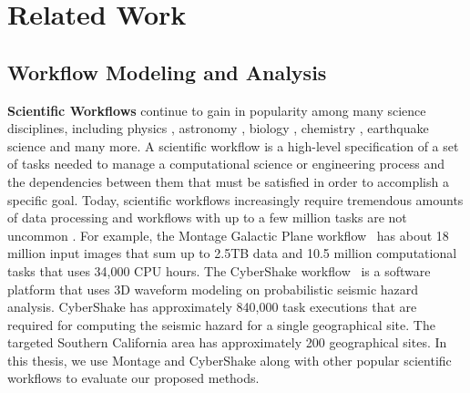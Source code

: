                              \chapter{Related Work}
\label{chap:related}






\section{Workflow Modeling and Analysis}

\textbf{Scientific Workflows} continue to gain in popularity among many science disciplines, including physics \cite{Deelman2002}, astronomy \cite{Sakellariou2010}, biology \cite{Lathers2006, Oinn2004}, chemistry \cite{Wieczorek2005}, earthquake science \cite{Maechling2007} and many more. A scientific workflow is a high-level specification of a set of tasks needed to manage a computational science or engineering process and the dependencies between them that must be satisfied in order to accomplish a specific goal. Today, scientific workflows increasingly require tremendous amounts of data processing and workflows with up to a few million tasks are not uncommon \cite{Callaghan2011}. For example, the Montage Galactic Plane workflow~\cite{Berriman2004} has about 18 million input images that sum up to 2.5TB data and 10.5 million computational tasks that uses 34,000 CPU hours. The CyberShake workflow~\cite{Callaghan2008} is a software platform that uses 3D waveform modeling on probabilistic seismic hazard analysis. CyberShake has approximately 840,000 task executions that are required for computing the seismic hazard for a single geographical site. The targeted Southern California area has approximately 200 geographical sites. In this thesis, we use Montage and CyberShake along with other popular scientific workflows to evaluate our proposed methods. 

